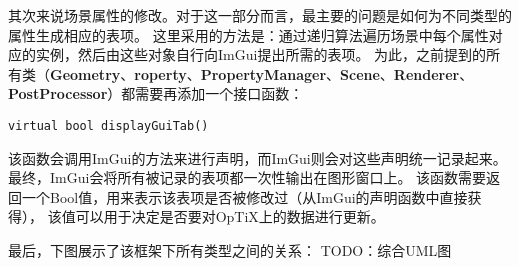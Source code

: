 其次来说场景属性的修改。对于这一部分而言，最主要的问题是如何为不同类型的属性生成相应的表项。
这里采用的方法是：通过递归算法遍历场景中每个属性对应的实例，然后由这些对象自行向ImGui提出所需的表项。
为此，之前提到的所有类（\textbf{Geometry}、\textbf{roperty}、\textbf{PropertyManager}、\textbf{Scene}、\textbf{Renderer}、\textbf{PostProcessor}）都需要再添加一个接口函数：
\lstset{language=C++}
\begin{lstlisting}
virtual bool displayGuiTab() 
\end{lstlisting}

该函数会调用ImGui的方法来进行声明，而ImGui则会对这些声明统一记录起来。
最终，ImGui会将所有被记录的表项都一次性输出在图形窗口上。
该函数需要返回一个Bool值，用来表示该表项是否被修改过（从ImGui的声明函数中直接获得），
该值可以用于决定是否要对OpTiX上的数据进行更新。

最后，下图展示了该框架下所有类型之间的关系：
TODO：综合UML图